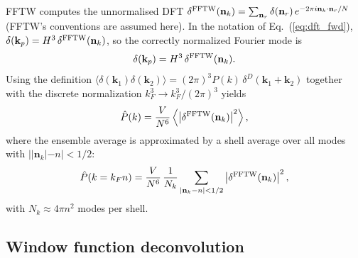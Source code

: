\documentclass[12pt]{article}
\newcommand{\bk}{\mathbf{k}}
\begin{document}
FFTW computes the unnormalised DFT
$\delta^{\rm FFTW}(\mathbf{n}_k) = \sum_{\mathbf{n}_r}
\delta(\mathbf{n}_r)\,e^{-2\pi i\mathbf{n}_k\cdot\mathbf{n}_r/N}$
(FFTW's conventions are assumed here).  In the notation of
Eq.~(\ref{eq:dft_fwd}), $\delta(\bk_p) = H^3\,\delta^{\rm FFTW}(\mathbf{n}_k)$,
so the correctly normalized Fourier mode is
%
\begin{equation}
  \delta(\bk_p) = H^3\,\delta^{\rm FFTW}(\mathbf{n}_k).
  \label{eq:delta_norm}
\end{equation}
%
Using the definition $\langle\delta(\bk_1)\delta(\bk_2)\rangle =
(2\pi)^3 P(k)\,\delta^D(\bk_1+\bk_2)$ together with the discrete
normalization $k_F^3 \to k_F^3/(2\pi)^3$ yields \citep{Jeong2010}
%
\begin{equation}
  \hat{P}(k) = \frac{V}{N^6}
    \left\langle\left|\delta^{\rm FFTW}(\mathbf{n}_k)\right|^2\right\rangle,
  \label{eq:Pk_est}
\end{equation}
%
where the ensemble average is approximated by a shell average over all
modes with $||\mathbf{n}_k| - n| < 1/2$:
%
\begin{equation}
  \hat{P}(k = k_F n) = \frac{V}{N^6}\,\frac{1}{N_k}
    \sum_{|\mathbf{n}_k - n| < 1/2}
    \left|\delta^{\rm FFTW}(\mathbf{n}_k)\right|^2,
  \label{eq:Pk_shell}
\end{equation}
%
with $N_k \approx 4\pi n^2$ modes per shell.

\subsection{Window function deconvolution}
\label{app:pk_deconv}
\end{document}
